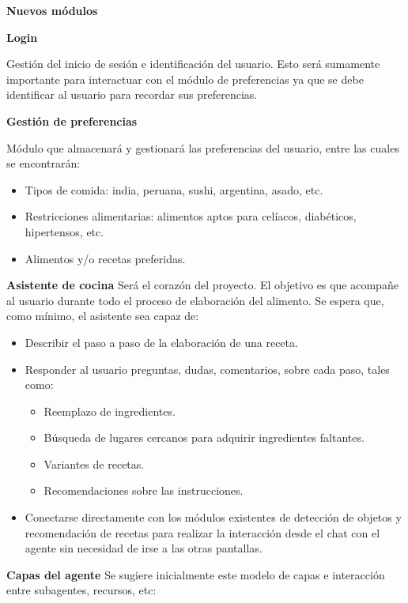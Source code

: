 \documentclass[
11pt, %
]{charter}
\begin{document}
\textbf{Nuevos módulos}

\textbf{Login}


Gestión del inicio de sesión e identificación del usuario. Esto será sumamente importante para interactuar con el módulo de preferencias ya que se debe identificar al usuario para recordar sus preferencias.

\newpage
\textbf{Gestión de preferencias}


Módulo que almacenará y gestionará las preferencias del usuario, entre las cuales se encontrarán:
\begin{itemize}
    \item Tipos de comida: india, peruana, sushi, argentina, asado, etc.
    \item Restricciones alimentarias: alimentos aptos para celíacos, diabéticos, hipertensos, etc.
    \item Alimentos y/o recetas preferidas.
\end{itemize}

\textbf{Asistente de cocina}
Será el corazón del proyecto. El objetivo es que acompañe al usuario durante todo el proceso de elaboración del alimento. Se espera que, como mínimo, el asistente sea capaz de:

\begin{itemize}
    \item Describir el paso a paso de la elaboración de una receta.
    \item Responder al usuario preguntas, dudas, comentarios, sobre cada paso, tales como:
    \begin{itemize}
        \item Reemplazo de ingredientes.
        \item Búsqueda de lugares cercanos para adquirir ingredientes faltantes.
        \item Variantes de recetas.
        \item Recomendaciones sobre las instrucciones.
    \end{itemize}
    \item Conectarse directamente con los módulos existentes de detección de objetos y recomendación de recetas para realizar la interacción desde el chat con el agente sin necesidad de irse a las otras pantallas.
\end{itemize}

\textbf{Capas del agente}
Se sugiere inicialmente este modelo de capas e interacción entre subagentes, recursos, etc:
\end{document}
